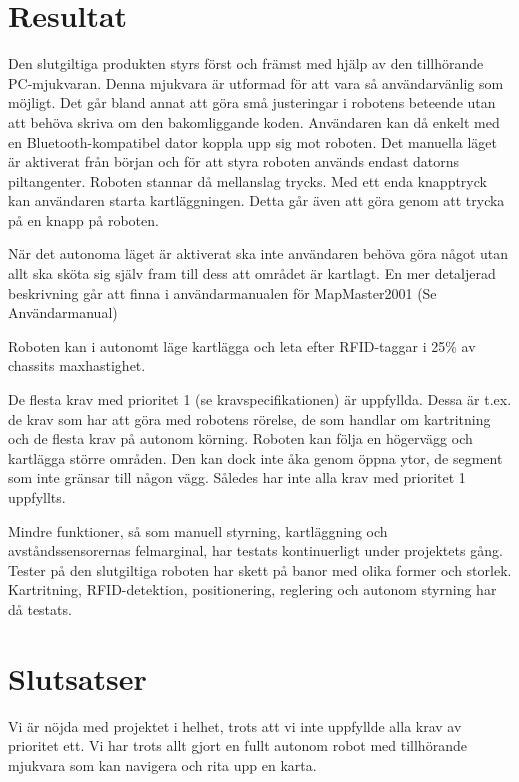 \documentclass[a4paper,12pt,fleqn]{article}
\begin{document}
\newpage
\section{Resultat}

Den slutgiltiga produkten styrs först och främst med hjälp av den tillhörande PC-mjukvaran. Denna mjukvara är utformad för att vara så användarvänlig som möjligt. Det går bland annat att göra små justeringar i robotens beteende utan att behöva skriva om den bakomliggande koden. Användaren kan då enkelt med en Bluetooth-kompatibel dator koppla upp sig mot roboten. Det manuella läget är aktiverat från början och för att styra roboten används endast datorns piltangenter. Roboten stannar då mellanslag trycks. Med ett enda knapptryck kan användaren starta kartläggningen. Detta går även att göra genom att trycka på en knapp på roboten.

När det autonoma läget är aktiverat ska inte användaren behöva göra något utan allt ska sköta sig själv fram till dess att området är kartlagt. En mer detaljerad beskrivning går att finna i användarmanualen för MapMaster2001 (Se Användarmanual)


Roboten kan i autonomt läge kartlägga och leta efter RFID-taggar i 25\% av chassits maxhastighet.

De flesta krav med prioritet 1 (se kravspecifikationen) är uppfyllda. Dessa är t.ex. de krav som har att göra med robotens rörelse, de som handlar om kartritning och de flesta krav på autonom körning. Roboten kan följa en högervägg och kartlägga större områden. Den kan dock inte åka genom öppna ytor, de segment som inte gränsar till någon vägg. Således har inte alla krav med prioritet 1 uppfyllts. 


Mindre funktioner, så som manuell styrning, kartläggning och avståndssensorernas felmarginal, har testats kontinuerligt under projektets gång. Tester på den slutgiltiga roboten har skett på banor med olika former och storlek. Kartritning, RFID-detektion, positionering, reglering och autonom styrning har då testats.


\newpage
\section{Slutsatser}
Vi är nöjda med projektet i helhet, trots att vi inte uppfyllde alla krav av prioritet ett. Vi har trots allt gjort en fullt autonom robot med tillhörande mjukvara som kan navigera och rita upp en karta. 
\end{document}
